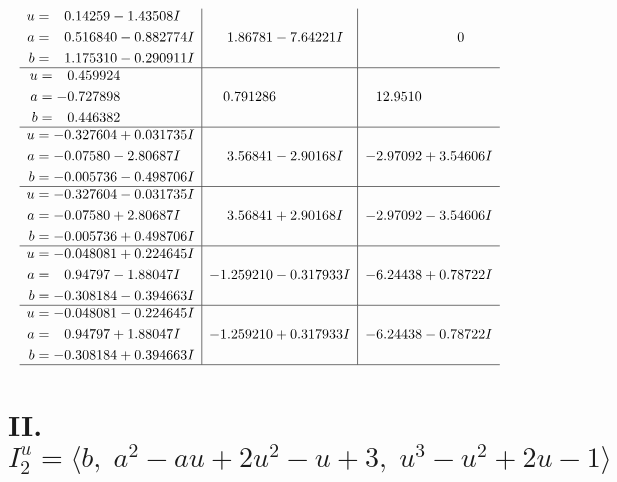 \documentclass[1p]{elsarticle_modified}
\theoremstyle{definition}
\begin{document}
$$\begin{array}{c|c|c}
\begin{aligned}
u &= \phantom{-}0.14259 - 1.43508 I \\
a &= \phantom{-}0.516840 - 0.882774 I \\
b &= \phantom{-}1.175310 - 0.290911 I\end{aligned}
 & \phantom{-}1.86781 - 7.64221 I & \phantom{-0.000000 } 0 \\ \hline\begin{aligned}
u &= \phantom{-}0.459924\phantom{ +0.000000I} \\
a &= -0.727898\phantom{ +0.000000I} \\
b &= \phantom{-}0.446382\phantom{ +0.000000I}\end{aligned}
 & \phantom{-}0.791286\phantom{ +0.000000I} & \phantom{-}12.9510\phantom{ +0.000000I} \\ \hline\begin{aligned}
u &= -0.327604 + 0.031735 I \\
a &= -0.07580 - 2.80687 I \\
b &= -0.005736 - 0.498706 I\end{aligned}
 & \phantom{-}3.56841 - 2.90168 I & -2.97092 + 3.54606 I \\ \hline\begin{aligned}
u &= -0.327604 - 0.031735 I \\
a &= -0.07580 + 2.80687 I \\
b &= -0.005736 + 0.498706 I\end{aligned}
 & \phantom{-}3.56841 + 2.90168 I & -2.97092 - 3.54606 I \\ \hline\begin{aligned}
u &= -0.048081 + 0.224645 I \\
a &= \phantom{-}0.94797 - 1.88047 I \\
b &= -0.308184 - 0.394663 I\end{aligned}
 & -1.259210 - 0.317933 I & -6.24438 + 0.78722 I \\ \hline\begin{aligned}
u &= -0.048081 - 0.224645 I \\
a &= \phantom{-}0.94797 + 1.88047 I \\
b &= -0.308184 + 0.394663 I\end{aligned}
 & -1.259210 + 0.317933 I & -6.24438 - 0.78722 I\\
 \hline 
 \end{array}$$\newpage\newpage\renewcommand{\arraystretch}{1}
\centering \section*{II. $I^u_{2}= \langle b,\;a^2- a u+2 u^2- u+3,\;u^3- u^2+2 u-1 \rangle$}
\end{document}
